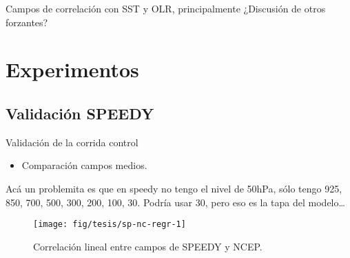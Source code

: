 \documentclass[spanish,a4paper]{book}
\providecommand{\tightlist}{%
  \setlength{\itemsep}{0pt}\setlength{\parskip}{0pt}}
\begin{document}
Campos de correlación con SST y OLR, principalmente ¿Discusión de otros
forzantes?

\chapter{Experimentos}\label{experimentos}

\section{Validación SPEEDY}\label{validacion-speedy}

Validación de la corrida control

\begin{itemize}
\tightlist
\item
  Comparación campos medios.
\end{itemize}

Acá un problemita es que en speedy no tengo el nivel de 50hPa, sólo
tengo 925, 850, 700, 500, 300, 200, 100, 30. Podría usar 30, pero eso es
la tapa del modelo\ldots{}

\begin{figure}
\texttt{[image: fig/tesis/sp-nc-regr-1]} \caption{Correlación lineal entre campos de SPEEDY y NCEP.}\label{fig:sp-nc-regr}
\end{figure}
\end{document}
